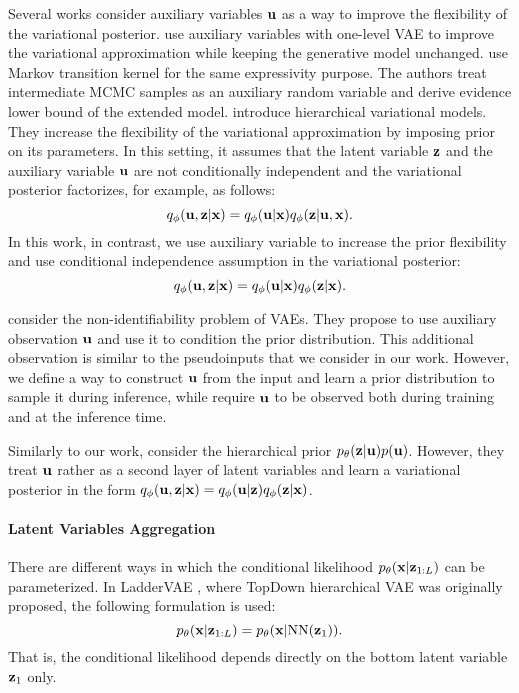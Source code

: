 Several works consider auxiliary variables ${\mathbf{u}}$ as a way to improve the flexibility of the variational posterior.
\citet{maaloe2016auxiliary} use auxiliary variables with one-level VAE to improve the variational approximation while keeping the generative model unchanged. 
\citet{salimans2015markov} use Markov transition kernel for the same expressivity purpose. The authors treat intermediate MCMC samples as an auxiliary random variable and derive evidence lower bound of the extended model. 
\citet{ranganath2016hierarchical} introduce hierarchical variational models. They increase the flexibility of the variational approximation by imposing prior on its parameters. 
In this setting, it assumes that the latent variable ${\mathbf{z}}$ and the auxiliary variable ${\mathbf{u}}$ are not conditionally independent and the variational posterior factorizes, for example, as follows:
\begin{equation}
    q_{\phi}({\mathbf{u}}, {\mathbf{z}}|{\mathbf{x}}) = q_{\phi}({\mathbf{u}}|{\mathbf{x}})q_{\phi}({\mathbf{z}}|{\mathbf{u}}, {\mathbf{x}}).
\end{equation}
In this work, in contrast, we use auxiliary variable to increase the prior flexibility and use conditional independence assumption in the variational posterior:
\begin{equation}
    q_{\phi}({\mathbf{u}}, {\mathbf{z}}|{\mathbf{x}}) = q_{\phi}({\mathbf{u}}|{\mathbf{x}})q_{\phi}({\mathbf{z}}|{\mathbf{x}}).
\end{equation}

\citet{khemakhem2020variational} consider the non-identifiability problem of VAEs. They propose to use auxiliary observation ${\mathbf{u}}$ and use it to condition the prior distribution. This additional observation is similar to the pseudoinputs that we consider in our work. However, we define a way to construct ${\mathbf{u}}$ from the input and learn a prior distribution to sample it during inference, while \citet{khemakhem2020variational} require ${\mathbf{u}}$ to be observed both during training and at the inference time.

Similarly to our work, \citep{klushyn2019learning} consider the hierarchical prior $p_{\theta}({\mathbf{z}}|{\mathbf{u}})p({\mathbf{u}})$. However, they treat ${\mathbf{u}}$ rather as a second layer of latent variables and learn a variational posterior in the form $q_{\phi}({\mathbf{u}}, {\mathbf{z}}|{\mathbf{x}}) = q_{\phi}({\mathbf{u}}|{\mathbf{z}})q_{\phi}({\mathbf{z}}|{\mathbf{x}})$. 

\paragraph{Latent Variables Aggregation}
There are different ways in which the conditional likelihood $p_{\theta}({\mathbf{x}}|{\mathbf{z}}_{1:L})$ can be parameterized. In LadderVAE \citep{sonderby2016ladder}, where TopDown hierarchical VAE was originally proposed, the following formulation is used:
\begin{equation}
    p_{\theta}({\mathbf{x}}|{\mathbf{z}}_{1:L}) = p_{\theta}({\mathbf{x}}|\text{NN}({\mathbf{z}}_{1})).
\end{equation}
That is, the conditional likelihood depends directly on the bottom latent variable ${\mathbf{z}}_{1}$ only. 

